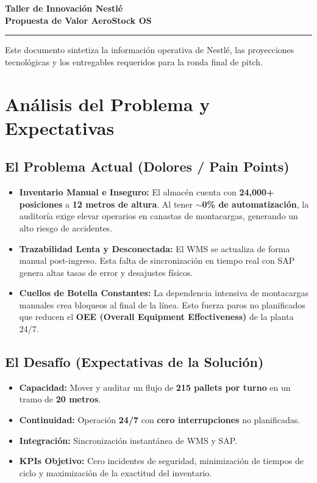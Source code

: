 \documentclass[12pt, a4paper]{article}
\begin{document}
\begin{center}
    \vspace*{1cm}
    \Huge \textbf{Taller de Innovación Nestlé} \\
    \vspace{0.5cm}
    \LARGE \textbf{Propuesta de Valor AeroStock OS} \\
    \vspace{1cm}
    \rule{\linewidth}{0.5mm}
\end{center}

\vspace{0.5cm}
Este documento sintetiza la información operativa de Nestlé, las proyecciones tecnológicas y los entregables requeridos para la ronda final de pitch.

\section{Análisis del Problema y Expectativas}

\subsection*{El Problema Actual (Dolores / Pain Points)}
\begin{itemize}[label=\textcolor{red}{\textbullet}]
    \item \textbf{Inventario Manual e Inseguro:} El almacén cuenta con \textbf{24,000+ posiciones} a \textbf{12 metros de altura}. Al tener \textbf{$\sim$0\% de automatización}, la auditoría exige elevar operarios en canastas de montacargas, generando un alto riesgo de accidentes.
    \item \textbf{Trazabilidad Lenta y Desconectada:} El WMS se actualiza de forma manual post-ingreso. Esta falta de sincronización en tiempo real con SAP genera altas tasas de error y desajustes físicos.
    \item \textbf{Cuellos de Botella Constantes:} La dependencia intensiva de montacargas manuales crea bloqueos al final de la línea. Esto fuerza paros no planificados que reducen el \textbf{OEE (Overall Equipment Effectiveness)} de la planta 24/7.
\end{itemize}

\subsection*{El Desafío (Expectativas de la Solución)}
\begin{itemize}[label=\textcolor{green}{\textbullet}]
    \item \textbf{Capacidad:} Mover y auditar un flujo de \textbf{215 pallets por turno} en un tramo de \textbf{20 metros}.
    \item \textbf{Continuidad:} Operación \textbf{24/7} con \textbf{cero interrupciones} no planificadas.
    \item \textbf{Integración:} Sincronización instantánea de WMS y SAP.
    \item \textbf{KPIs Objetivo:} Cero incidentes de seguridad, minimización de tiempos de ciclo y maximización de la exactitud del inventario.
\end{itemize}
\end{document}
